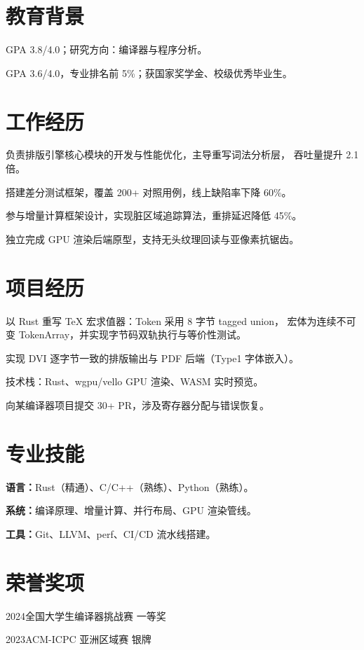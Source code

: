 \section{教育背景}

\item{GPA 3.8/4.0；研究方向：编译器与程序分析。}
\item{GPA 3.6/4.0，专业排名前 5\%；获国家奖学金、校级优秀毕业生。}

\section{工作经历}

\item{负责排版引擎核心模块的开发与性能优化，主导重写词法分析层，
      吞吐量提升 2.1 倍。}
\item{搭建差分测试框架，覆盖 200+ 对照用例，线上缺陷率下降 60\%。}

\item{参与增量计算框架设计，实现脏区域追踪算法，重排延迟降低 45\%。}
\item{独立完成 GPU 渲染后端原型，支持无头纹理回读与亚像素抗锯齿。}

\section{项目经历}

\item{以 Rust 重写 TeX 宏求值器：Token 采用 8 字节 tagged union，
      宏体为连续不可变 TokenArray，并实现字节码双轨执行与等价性测试。}
\item{实现 DVI 逐字节一致的排版输出与 PDF 后端（Type1 字体嵌入）。}
\item{技术栈：Rust、wgpu/vello GPU 渲染、WASM 实时预览。}

\item{向某编译器项目提交 30+ PR，涉及寄存器分配与错误恢复。}

\section{专业技能}

\item{{\bf 语言：}Rust（精通）、C/C++（熟练）、Python（熟练）。}
\item{{\bf 系统：}编译原理、增量计算、并行布局、GPU 渲染管线。}
\item{{\bf 工具：}Git、LLVM、perf、CI/CD 流水线搭建。}

\section{荣誉奖项}

\item{2024\quad 全国大学生编译器挑战赛 一等奖}
\item{2023\quad ACM-ICPC 亚洲区域赛 银牌}

\bye
